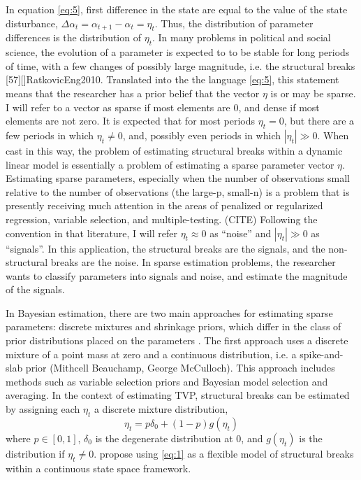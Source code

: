 \documentclass{article}
\begin{document}
In equation \eqref{eq:5}, first difference in the state are equal to the value of the state disturbance, $\Delta \alpha_{t} = \alpha_{t+1} - \alpha_{t} = \eta_{t}$.
Thus, the distribution of parameter differences is the distribution of $\eta_{t}$.
In many problems in political and social science, the evolution of a parameter is expected to to be stable for long periods of time, with a few changes of possibly large magnitude, i.e. the structural breaks \parencite{Pierson2004}[57][]{RatkovicEng2010}.
Translated into the the language \eqref{eq:5}, this statement means that the researcher has a prior belief that the vector $\eta$ is or may be sparse.
I will refer to a vector as sparse if most elements are 0, and dense if most elements are not zero.
It is expected that for most periods $\eta_{t} = 0$, but there are a few periods in which $\eta_{t} \neq 0$, and, possibly even periods in which $|\eta_{t}| \gg 0$.
When cast in this way, the problem of estimating structural breaks within a dynamic linear model is essentially a problem of estimating a sparse parameter vector $\eta$.
Estimating sparse parameters, especially when the number of observations small relative to the number of observations (the large-p, small-n) is a problem that is presently receiving much attention in the areas of penalized or regularized regression, variable selection, and multiple-testing. (CITE)
Following the convention in that literature, I will refer $\eta_{t} \approx 0$ as ``noise'' and $|\eta_{t}| \gg 0$ as ``signals''.
In this application, the structural breaks are the signals, and the non-structural breaks are the noise.
In sparse estimation problems, the researcher wants to classify parameters into signals and noise, and estimate the magnitude of the signals.

In Bayesian estimation, there are two main approaches for estimating sparse parameters: discrete mixtures and shrinkage priors, which differ in the class of prior distributions placed on the parameters \textcite[73]{CarvalhoPolsonScott2009}.
The first approach uses a discrete mixture of a point mass at zero and a continuous distribution, i.e. a spike-and-slab prior (Mithcell Beauchamp, George McCulloch).
This approach includes methods such as variable selection priors and Bayesian model selection and averaging.
In the context of estimating TVP, structural breaks can be estimated by assigning each $\eta_{t}$ a discrete mixture distribution,
\begin{equation}
  \label{eq:1}
  \eta_{t} = p \delta_{0} +  (1 - p) g(\eta_{t})
\end{equation}
where $p \in [0, 1]$, $\delta_{0}$ is the degenerate distribution at 0, and $g(\eta_{t})$ is the distribution if $\eta_{t} \neq 0$.
\textcite{GiordaniKohn2008} propose using \eqref{eq:1} as a flexible model of structural breaks within a continuous state space framework.
\end{document}
